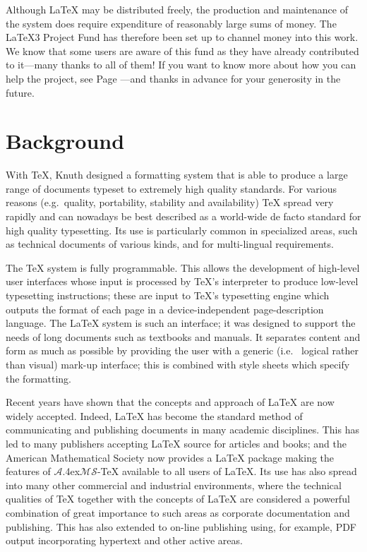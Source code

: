\documentclass[a4paper]{article}
\newcommand{\eg}{e.g.~}
\newcommand{\ie}{i.e.~}
\newcommand{\PDF}{{\sc PDF}}
\newcommand{\AmSTeX}{$\mathcal A$\lower.4ex\hbox{$\!\mathcal
                                            M\!$}$\mathcal S$-\TeX}
\begin{document}
Although \LaTeX{} may be distributed freely, the production and
maintenance of the system does require expenditure of reasonably large
sums of money.  The \LaTeX3 Project Fund has therefore been set up to
channel money into this work.  We know that some users are 
aware of this fund as they have already contributed to it---many
thanks to all of them!  If you want to know more about how you can
help the project, see Page \pageref{fund}---and thanks in advance for
your generosity in the future.


\section{Background}

With \TeX{}, Knuth designed a formatting system that is able to
produce a large range of documents typeset to extremely high quality
standards. For various reasons (\eg quality, portability, stability
and availability) \TeX{} spread very rapidly and can nowadays be best
described as a world-wide de facto standard for high quality
typesetting. Its use is particularly common in specialized areas, such
as technical documents of various kinds, and for multi-lingual
requirements.
 
The \TeX{} system is fully programmable. This allows the development
of high-level user interfaces whose input is processed by \TeX{}'s
interpreter to produce low-level typesetting instructions; these are
input to \TeX{}'s typesetting engine which outputs the format of each
page in a device-independent page-description language.  The \LaTeX{}
system is such an interface; it was designed to support the needs of
long documents such as textbooks and manuals. It separates content and
form as much as possible by providing the user with a generic (\ie
logical rather than visual) mark-up interface; this is combined with
style sheets which specify the formatting.
 
Recent years have shown that the concepts and approach of \LaTeX{} are
now widely accepted. Indeed, \LaTeX{} has become the standard method
of communicating and publishing documents in many academic
disciplines.  This has led to many publishers accepting \LaTeX{}
source for articles and books; and the American Mathematical Society
now provides a \LaTeX{} package making the features of \AmSTeX{}
available to all users of \LaTeX{}.  Its use has also spread into many
other commercial and industrial environments, where the technical
qualities of \TeX{} together with the concepts of \LaTeX{} are
considered a powerful combination of great importance to such areas as
corporate documentation and publishing.  This has also extended to
on-line publishing using, for example, \PDF{} output incorporating
hypertext and other active areas.
  
\end{document}
